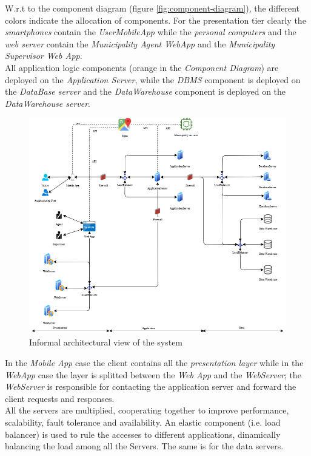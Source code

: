 \documentclass[a4paper]{report}
\begin{document}
W.r.t to the component diagram (figure \ref{fig:component-diagram}), the different colors indicate the allocation of components.
For the presentation tier clearly the \textit{smartphones} contain the \textit{UserMobileApp} while the \textit{personal computers} and the \textit{web server} contain the \textit{Municipality Agent WebApp} and the \textit{Municipality Supervisor Web App}.\\
All application logic components (orange in the \textit{Component Diagram}) are deployed on the \textit{Application Server}, while the \textit{DBMS} component is deployed on the \textit{DataBase server} and the \textit{DataWarehouse} component is deployed on the \textit{DataWarehouse server}.

\begin{figure}[htp]
\includegraphics[scale=0.55]{SystemArchitecture}
\caption{Informal architectural view of the system}
\label{fig:architecture-diagram}
\end{figure}
In the \textit{Mobile App} case the client contains all the \textit{presentation layer} while in the \textit{WebApp} case the layer is splitted between the \textit{Web App} and the \textit{WebServer}; the \textit{WebServer} is responsible for contacting the application server and forward the client requests and responses.\\
All the servers are multiplied, cooperating together to improve performance, scalability, fault tolerance and availability. An elastic component (i.e. load balancer) is used to rule the accesses to different applications, dinamically balancing the load among all the Servers. The same is for the data servers.
\end{document}
